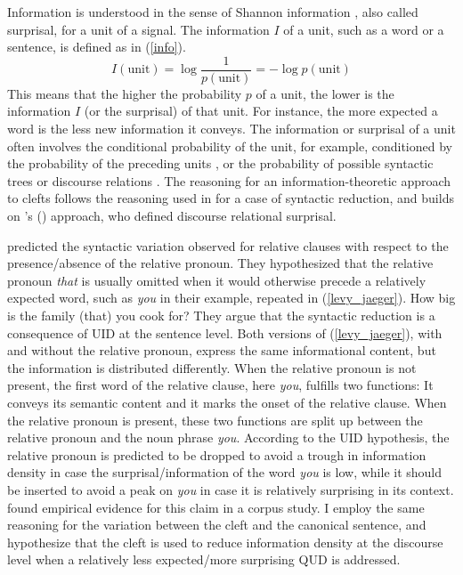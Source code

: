 \documentclass[output=paper,colorlinks,citecolor=brown]{langscibook}
\begin{document}
\hspace*{-1.3pt}Information is understood in the sense of Shannon information \citep{shannon_1948}, also called surprisal, for a unit of a signal. The information $I$ of a unit, such as a word or a sentence, is defined as in (\ref{info}).
\begin{equation}
    \label{info}I(\text{unit}) = \log\frac{1}{p(\text{unit})} = -\log p(\text{unit})
\end{equation}
This means that the higher the probability $p$ of a unit, the lower is the information $I$ (or the surprisal) of that unit. For instance, the more expected a word is the less new information it conveys. The information or surprisal of a unit often involves the conditional probability of the unit, for example, conditioned by the probability of the preceding units \citep{levy_jaeger_2007}, or the probability of possible syntactic trees \citep{demberg_keller_2008} or discourse relations \citep{asr_demberg_2015}. The reasoning for an information-theoretic approach to clefts follows the reasoning used in \citet{levy_jaeger_2007} for a case of syntactic reduction, and builds on \citeauthor{asr_demberg_2015}'s (\citeyear{asr_demberg_2015}) approach, who defined discourse relational surprisal.

\citet{levy_jaeger_2007} predicted the syntactic variation observed for relative clauses with respect to the presence/absence of the relative pronoun. They hypothesized that the relative pronoun \textit{that} is usually omitted when it would otherwise precede a relatively expected word, such as \textit{you} in their example, repeated in (\ref{levy_jaeger}). 
\ea\label{levy_jaeger}How big is the family (that) you cook for?\hfill\citep[][851]{levy_jaeger_2007}
\z
They argue that the syntactic reduction is a consequence of UID at the sentence level. Both versions of (\ref{levy_jaeger}), with and without the relative pronoun, express the same informational content, but the information is distributed differently. When the relative pronoun is not present, the first word of the relative clause, here \textit{you}, fulfills two functions: It conveys its semantic content and it marks the onset of the relative clause. When the relative pronoun is present, these two functions are split up between the relative pronoun and the noun phrase \textit{you}. According to the UID hypothesis, the relative pronoun is predicted to be dropped to avoid a trough in information density in case the surprisal/information of the word \textit{you} is low, while it should be inserted to avoid a peak on \textit{you} in case it is relatively surprising in its context. \citet{levy_jaeger_2007} found empirical evidence for this claim in a corpus study. I employ the same reasoning for the variation between the cleft and the canonical sentence, and hypothesize that the cleft is used to reduce information density at the discourse level when a relatively less expected/more surprising QUD is addressed.
\end{document}
